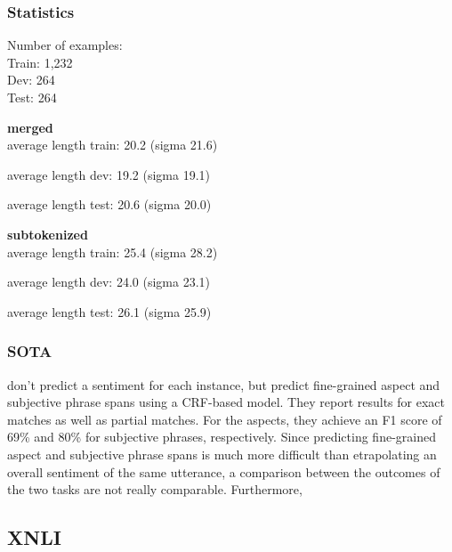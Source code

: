 \subsubsection{Statistics}

Number of examples: \\
Train: 1,232 \\
Dev: 264 \\
Test: 264

\textbf{merged} \\
average length train: 20.2 (sigma 21.6)

average length dev: 19.2 (sigma 19.1)

average length test: 20.6 (sigma 20.0)

\textbf{subtokenized} \\

average length train: 25.4 (sigma 28.2)

average length dev: 24.0 (sigma 23.1)

average length test: 26.1 (sigma 25.9)

\subsubsection{SOTA}

\cite{sanger2016scare} don't predict a sentiment for each instance, but predict fine-grained
aspect and subjective phrase spans using a CRF-based model.
They report results for exact matches as well as partial matches.
For the aspects, they achieve an F1 score of 69\% and 80\% for subjective phrases, respectively.
Since predicting fine-grained aspect and subjective phrase spans is much more difficult than
etrapolating an overall sentiment of the same utterance, a comparison between the outcomes of the
two tasks are not really comparable.
Furthermore,




\subsection{XNLI}

